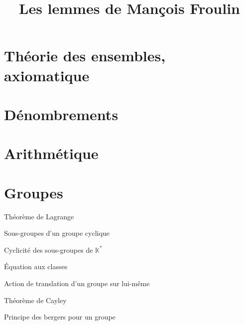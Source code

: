 \documentclass[french]{article}
\title{Les lemmes de Mançois Froulin}
\date{}
\newcommand{\K}{\mathbb{K}}
\newcommand{\st}{^*}
\theoremstyle{definition}
\begin{document}
\maketitle

\section{Théorie des ensembles, axiomatique}

\section{Dénombrements}

\section{Arithmétique}

\section{Groupes}

\begin{lem}{Théorème de Lagrange}
	
\end{lem}

\begin{lem}{Sous-groupes d'un groupe cyclique}
	
\end{lem}

\begin{lem}{Cyclicité des sous-groupes de $\K\st$}
	
\end{lem}

\begin{lem}{Équation aux classes}
	
\end{lem}

\begin{lem}{Action de translation d'un groupe sur lui-même}
	
\end{lem}

\begin{lem}{Théorème de Cayley}
	
\end{lem}

\begin{lem}{Principe des bergers pour un groupe}
	
\end{lem}
\end{document}
